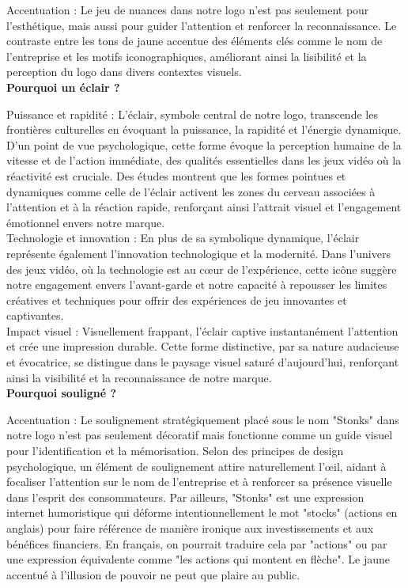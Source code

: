 Accentuation : Le jeu de nuances dans notre logo n'est pas seulement pour l'esthétique, mais aussi pour guider l'attention et renforcer la reconnaissance. Le contraste entre les tons de jaune accentue des éléments clés comme le nom de l'entreprise et les motifs iconographiques, améliorant ainsi la lisibilité et la perception du logo dans divers contextes visuels.
\\

\textbf{Pourquoi un éclair ?}
\vspace*{0.2cm}

Puissance et rapidité : L'éclair, symbole central de notre logo, transcende les frontières culturelles en évoquant la puissance, la rapidité et l'énergie dynamique.
D'un point de vue psychologique, cette forme évoque la perception humaine de la vitesse et de l'action immédiate, des qualités essentielles dans les jeux vidéo où la réactivité est cruciale.
Des études montrent que les formes pointues et dynamiques comme celle de l'éclair activent les zones du cerveau associées à l'attention et à la réaction rapide, renforçant ainsi l'attrait visuel et l'engagement émotionnel envers notre marque.
\\

Technologie et innovation : En plus de sa symbolique dynamique, l'éclair représente également l'innovation technologique et la modernité.
Dans l'univers des jeux vidéo, où la technologie est au cœur de l'expérience, cette icône suggère notre engagement envers l'avant-garde et notre capacité à repousser les limites créatives et techniques pour offrir des expériences de jeu innovantes et captivantes.
\\

Impact visuel : Visuellement frappant, l'éclair captive instantanément l'attention et crée une impression durable.
Cette forme distinctive, par sa nature audacieuse et évocatrice, se distingue dans le paysage visuel saturé d'aujourd'hui, renforçant ainsi la visibilité et la reconnaissance de notre marque.
\\

\textbf{Pourquoi souligné ?}
\vspace*{0.2cm}

Accentuation : Le soulignement stratégiquement placé sous le nom "Stonks" dans notre logo n'est pas seulement décoratif mais fonctionne comme un guide visuel pour l'identification et la mémorisation.
Selon des principes de design psychologique, un élément de soulignement attire naturellement l'œil, aidant à focaliser l'attention sur le nom de l'entreprise et à renforcer sa présence visuelle dans l'esprit des consommateurs.
Par ailleurs, "Stonks" est une expression internet humoristique qui déforme intentionnellement le mot "stocks" (actions en anglais) pour faire référence de manière ironique aux investissements et aux bénéfices financiers.
En français, on pourrait traduire cela par "actions" ou par une expression équivalente comme "les actions qui montent en flèche".
Le jaune accentué à l'illusion de pouvoir ne peut que plaire au public.
\\

